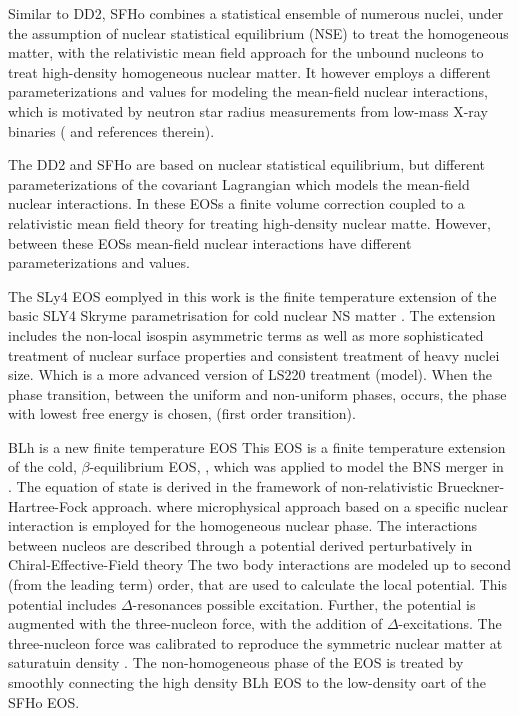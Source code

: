Similar to DD2, SFHo combines a statistical ensemble of numerous nuclei, under the assumption of nuclear
statistical equilibrium (NSE) to treat the homogeneous matter, 
with the relativistic mean field approach for the unbound nucleons to treat high-density homogeneous nuclear matter.
It however employs a different parameterizations and values for modeling the mean-field nuclear interactions, 
which is motivated by neutron star radius measurements from low-mass X-ray
binaries (\cite{Steiner:2012rk} and references therein).

The DD2 and SFHo are based on nuclear statistical equilibrium, but 
different parameterizations of the covariant Lagrangian which models the mean-field nuclear interactions.
In these EOSs a finite volume correction coupled to a relativistic mean field theory for treating high-density nuclear matte. However, between these EOSs mean-field nuclear interactions have different parameterizations and values.

The SLy4 EOS eomplyed in this work is the finite temperature extension \cite{daSilvaSchneider:2017jpg}
of the basic SLY4 Skryme parametrisation for cold nuclear NS matter \cite{Douchin:2001sv}.
The extension includes the non-local isospin asymmetric terms as well as more sophisticated 
treatment of nuclear surface properties and consistent treatment of heavy nuclei size. 
Which is a more advanced version of LS220 treatment (model).
When the phase transition, between the uniform and non-uniform phases, occurs, the phase with lowest 
free energy is chosen, (first order transition).

BLh is a new finite temperature EOS \cite{Logoteta:2020yxf}
This EOS is a finite temperature extension of the cold, $\beta$-equilibrium EOS, \cite{Bombaci:2018ksa},
which was applied to model the BNS merger in \cite{Endrizzi:2018uwl}.
The equation of state is derived in the framework of non-relativistic Brueckner-Hartree-Fock approach.
where microphysical approach based on a specific nuclear interaction is employed for the homogeneous nuclear phase.
The interactions between nucleos are described through a potential derived perturbatively 
in Chiral-Effective-Field theory \cite{Machleidt:2011zz}
The two body interactions are modeled up to second (from the leading term) order, that are used to calculate the local potential. This potential includes $\Delta$-resonances possible excitation. 
Further, the potential is augmented with the three-nucleon force, with the addition of $\Delta$-excitations.
The three-nucleon force was calibrated to reproduce the symmetric nuclear matter at saturatuin density \cite{Logoteta:2016nzc}.
The non-homogeneous phase of the EOS is treated by smoothly connecting the high density BLh EOS to the low-density oart of the SFHo EOS.


